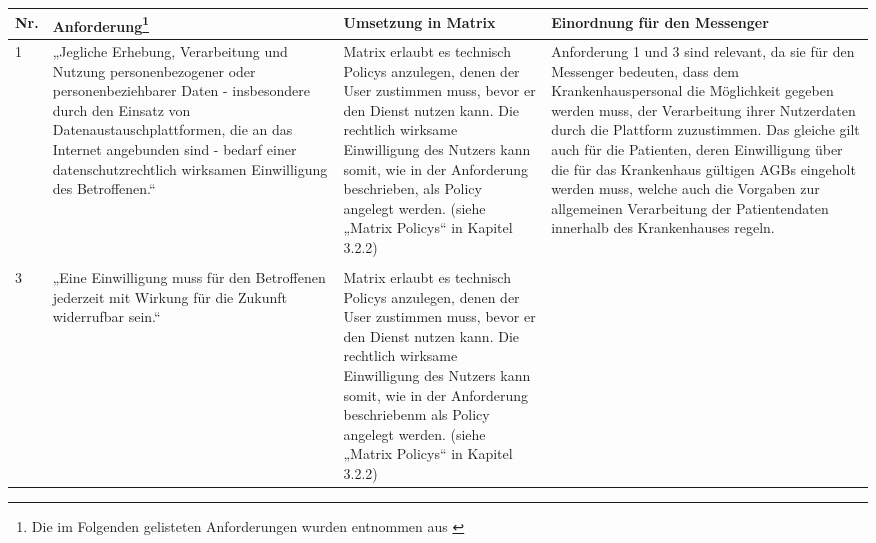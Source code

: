 \begin{longtable}{p{0.6cm}|p{4cm}|p{5cm}|p{5cm}}
    \hline
Nr. & Anforderung\footnote{Die im Folgenden gelisteten Anforderungen wurden entnommen aus \cite[S. 41 ff.]{Bundesverband-Gesundheits-IT-e.V.2016}}                                                                                                                                                                                                                                                                                          & Umsetzung in Matrix          & Einordnung für den Messenger                                                                                                                                                                                                                                                                                                                                                                                                                                                                                                                                        \\ \hline
1 &
  „Jegliche Erhebung, Verarbeitung und Nutzung personenbezogener oder personenbeziehbarer Daten - insbesondere durch den Einsatz von Datenaustauschplattformen, die an das Internet angebunden sind - bedarf einer datenschutzrechtlich wirksamen Einwilligung des Betroffenen.“ &
  Matrix erlaubt es technisch Policys anzulegen, denen der User zustimmen muss, bevor er den Dienst nutzen kann. Die rechtlich wirksame Einwilligung des Nutzers kann somit, wie in der Anforderung beschrieben, als Policy angelegt werden. (siehe „Matrix Policys“ in Kapitel 3.2.2)&
  Anforderung 1 und 3 sind relevant, da sie für den Messenger bedeuten, dass dem Krankenhauspersonal die Möglichkeit gegeben werden muss, der Verarbeitung ihrer Nutzerdaten durch die Plattform zuzustimmen. Das gleiche gilt auch für die Patienten, deren Einwilligung über die für das Krankenhaus gültigen AGBs eingeholt werden muss, welche auch die Vorgaben zur allgemeinen Verarbeitung der Patientendaten innerhalb des Krankenhauses regeln. \\
  \\ \hline
  3 &
  „Eine Einwilligung muss für den Betroffenen jederzeit mit Wirkung für die Zukunft widerrufbar sein.“ &
  Matrix erlaubt es technisch Policys anzulegen, denen der User zustimmen muss, bevor er den Dienst nutzen kann. Die rechtlich wirksame Einwilligung des Nutzers kann somit, wie in der Anforderung beschriebenm als Policy angelegt werden. (siehe „Matrix Policys“ in Kapitel 3.2.2)&

\end{longtable}
